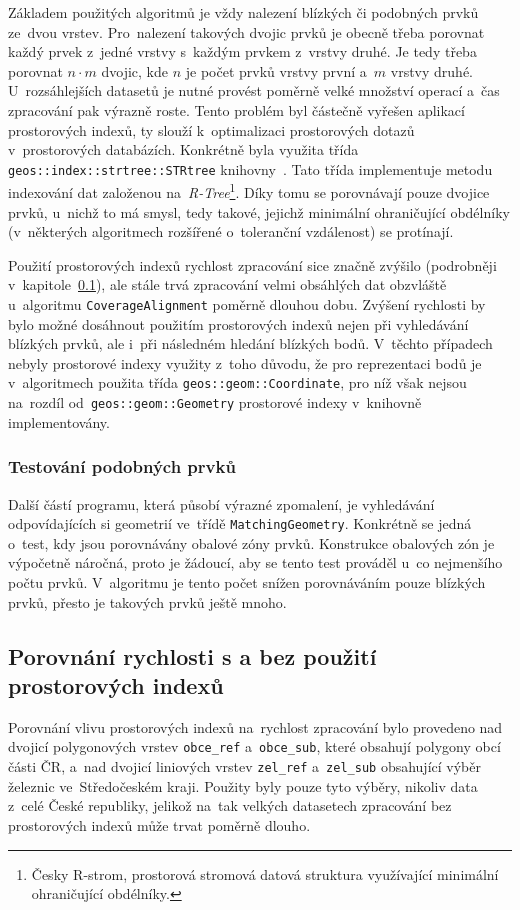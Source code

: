 Základem použitých algoritmů je vždy nalezení blízkých či podobných prvků 
ze~dvou vrstev. Pro~nalezení takových dvojic prvků je obecně třeba porovnat 
každý prvek z~jedné vrstvy s~každým prvkem z~vrstvy druhé. Je tedy třeba 
porovnat $n\cdot m$ dvojic, kde $n$ je počet prvků vrstvy první a~$m$ vrstvy 
druhé. U~rozsáhlejších datasetů je nutné provést poměrně velké množství 
operací a~čas zpracování pak výrazně roste. Tento pro\-blém byl částečně vyřešen 
aplikací prostorových indexů, ty slouží k~optimalizaci prostorových dotazů 
v~pro\-storových databázích. Konkrétně byla 
využita třída \texttt{geos::index::strtree::STRtree} knihovny~.
Tato třída implementuje metodu indexování dat založenou 
na~\textit{R-Tree}\footnote{Česky R-strom, prostorová stromová datová struktura 
využívající minimální ohraničující obdélníky.}. Díky tomu se porovnávají pouze 
dvojice prvků, u~nichž to má smysl, tedy takové, jejichž minimální ohraničující 
obdélníky (v~některých algoritmech rozšířené o~toleranční vzdálenost) se protínají. 

Použití prostorových indexů rychlost zpracování sice značně zvýšilo (podrobněji 
v~kapitole~\ref{problemy-test}), ale stále trvá zpracování velmi obsáhlých dat 
obzvláště u~algo\-ritmu \texttt{Coverage\-Alignment} poměrně 
dlouhou dobu. Zvýšení rychlosti by bylo možné dosáhnout použitím prostorových 
indexů nejen při vyhledávání blízkých prvků, ale i~při následném hledání 
blízkých bodů. V~těchto případech nebyly prostorové indexy využity z~toho 
důvodu, že pro reprezentaci bodů je v~algoritmech použita třída 
\texttt{geos::geom::Coordinate}, pro níž však nejsou na~rozdíl 
od~\texttt{geos::geom::Geometry} prostorové indexy v~knihovně 
 implementovány.

\subsubsection{Testování podobných prvků}

Další částí programu, která působí výrazné zpomalení, je vyhledávání
odpovídajících si geometrií ve~třídě \texttt{MatchingGeometry}. Konkrétně
se jedná o~test, kdy jsou porovnávány obalové zóny prvků. Konstrukce
obalových zón je výpočetně náročná, proto je žádoucí, aby se tento test
prováděl u~co nejmenšího počtu prvků. V~algoritmu je tento počet snížen
porovnáváním pouze blízkých prvků, přesto je takových prvků ještě mnoho.


\subsection{Porovnání rychlosti s a bez použití prostorových indexů}
\label{problemy-test}
Porovnání vlivu prostorových indexů na~rychlost zpracování bylo provedeno 
nad dvojicí polygonových vrstev \texttt{obce\_ref} a~\texttt{obce\_sub}, 
které obsahují polygony obcí části ČR, a~nad dvojicí li\-niových vrstev 
\texttt{zel\_ref} a~\texttt{zel\_sub} obsahující výběr železnic ve~Středočeském 
kraji. Použity byly pouze tyto výběry, nikoliv data z~celé České republiky,
jelikož na~tak velkých datasetech zpracování bez prostorových indexů může 
trvat poměrně dlouho.

